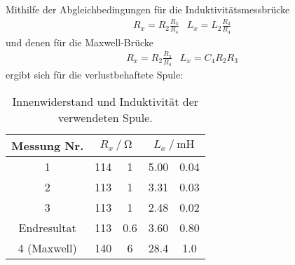     Mithilfe der Abgleichbedingungen für die Induktivitätsmessbrücke 
    \begin{align}
        R_x=R_2 \frac{R_3}{R_4}
        &L_x=L_2 \frac{R_3}{R_4}
    \end{align}
    und denen für die Maxwell-Brücke 
    \begin{align}
        R_x=R_2 \frac{R_3}{R_4}
        &L_x=C_4 R_2 R_3
    \end{align}
    ergibt sich für die verlustbehaftete Spule: 
    \begin{table}
        \centering
        \caption{Innenwiderstand und Induktivität der verwendeten Spule.}
        \label{tab:R_L_Spule}
        \begin{tabular}{c S[table-format=3.0] @{${}\pm{}$} S[table-format=1.1] S[table-format=2.2] @{${}\pm{}$} S[table-format=1.2]}
            \toprule
            {Messung Nr.} &  &  \\
                       & 114 & 1 & 5.00 & 0.04 \\
            2           & 113 & 1 & 3.31 & 0.03 \\
            3           & 113 & 1 & 2.48 & 0.02 \\
            Endresultat & 113 & 0.6& 3.60 & 0.80 \\
            4 (Maxwell) & 140 & 6 & 28.4 & 1.0  \\ %
            \bottomrule
        \end{tabular}
    \end{table}


